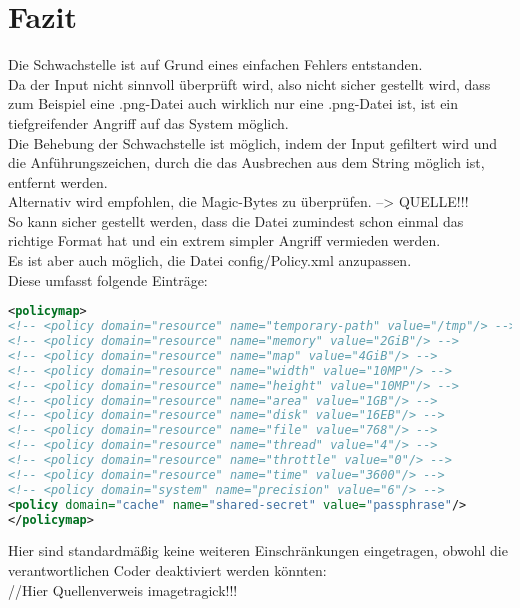 \chapter{Fazit}\label{ch:fazit}

Die Schwachstelle ist auf Grund eines einfachen Fehlers entstanden.\\
Da der Input nicht sinnvoll überprüft wird, also nicht sicher gestellt wird, dass zum Beispiel eine .png-Datei auch wirklich nur eine .png-Datei ist, ist ein tiefgreifender Angriff auf das System möglich.\\

Die Behebung der Schwachstelle ist möglich, indem der Input gefiltert wird und die Anführungszeichen, durch die das Ausbrechen aus dem String möglich ist, entfernt werden.\\

Alternativ wird empfohlen, die Magic-Bytes zu überprüfen. --> QUELLE!!!\\
So kann sicher gestellt werden, dass die Datei zumindest schon einmal das richtige Format hat und ein extrem simpler Angriff vermieden werden.\\

Es ist aber auch möglich, die Datei config/Policy.xml anzupassen.\\
Diese umfasst folgende Einträge:\\

\begin{lstlisting}[firstnumber=47, language=XML, caption=config/Policy.xml Inhalt,label={lst:lstlisting}]
<policymap>
<!-- <policy domain="resource" name="temporary-path" value="/tmp"/> -->
<!-- <policy domain="resource" name="memory" value="2GiB"/> -->
<!-- <policy domain="resource" name="map" value="4GiB"/> -->
<!-- <policy domain="resource" name="width" value="10MP"/> -->
<!-- <policy domain="resource" name="height" value="10MP"/> -->
<!-- <policy domain="resource" name="area" value="1GB"/> -->
<!-- <policy domain="resource" name="disk" value="16EB"/> -->
<!-- <policy domain="resource" name="file" value="768"/> -->
<!-- <policy domain="resource" name="thread" value="4"/> -->
<!-- <policy domain="resource" name="throttle" value="0"/> -->
<!-- <policy domain="resource" name="time" value="3600"/> -->
<!-- <policy domain="system" name="precision" value="6"/> -->
<policy domain="cache" name="shared-secret" value="passphrase"/>
</policymap>
\end{lstlisting}
\vspace{5mm}

Hier sind standardmäßig keine weiteren Einschränkungen eingetragen, obwohl die verantwortlichen Coder deaktiviert werden könnten:\\
//Hier Quellenverweis imagetragick!!!

